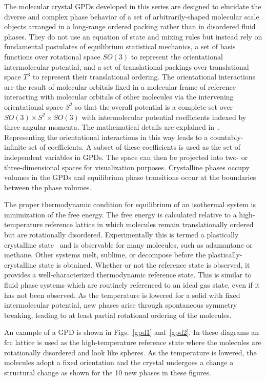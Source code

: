 \documentclass[preprint]{iucr}              %
\begin{document}
The molecular crystal GPDs developed in this series are designed to elucidate
the diverse and complex phase behavior of a set of arbitrarily-shaped molecular
scale objects arranged in a long-range ordered packing rather than in
disordered fluid phases.  They do not use an equation of state and mixing rules
but instead rely on fundamental postulates of equilibrium statistical
mechanics, a set of basis functions over rotational space $SO(3)$ to represent
the orientational intermolecular potential, and a set of translational packings
over translational space $T^3$ to represent their translational ordering.  The
orientational interactions are the result of molecular orbitals fixed in a
molecular frame of reference interacting with molecular orbitals of other
molecules via the intervening orientational space $S^2$ so that the overall
potential is a complete set over $SO(3) \times S^2 \times SO(3)$ with
intermolecular potential coefficients indexed by three angular momenta.  The
mathematical details are explained in~\cite{Mettes04}.  Representing the
orientational interactions in this way leads to a countably-infinite set of
coefficients.  A subset of these coefficients is used as the set of independent
variables in GPDs.  The space can then be projected into two- or
three-dimensional spaces for visualization purposes.  Crystalline phases occupy
volumes in the GPDs and equilibrium phase transitions occur at the boundaries
between the phase volumes.  

The proper thermodynamic condition for equilibrium of an isothermal system is
minimization of the free energy.  The free energy is calculated relative to a
high-temperature reference lattice in which molecules remain translationally ordered but are
rotationally disordered. Experimentally this is termed a plastically
crystalline state~\cite{Sherwood79} and is observable for many molecules,
such as adamantane or methane.  Other systems melt, sublime, or decompose
before the plastically-crystalline state is obtained.  Whether or not the reference state is observed, it provides a well-characterized thermodynamic reference state. This is similar to fluid phase systems which are routinely referenced to an
ideal gas state, even if it has not been observed.  As the temperature is
lowered for a solid with fixed intermolecular potential, new phases arise
through spontaneous symmetry breaking, leading to at least partial rotational
ordering of the molecules.  

An example of a GPD is shown in Figs.~\ref{gpd1} and~\ref{gpd2}.  In these
diagrams an fcc lattice is used as the high-temperature reference state where
the molecules are rotationally disordered and look like spheres.  As the temperature is lowered, the molecules adopt a fixed
orientation and the crystal undergoes a change a structural change as shown for
the 10 new phases in these figures.  
\end{document}
